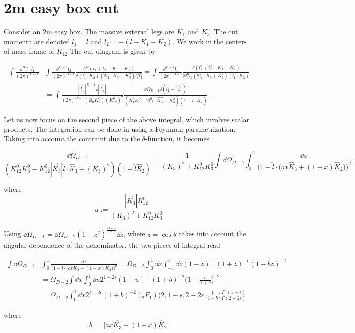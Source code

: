\section{2m easy box cut}
Consider an 2m easy box.
The massive external legs are $K_1$ and $K_3$.
The cut momenta are denoted $l_1 = l$ and $l_2 = -( l-K_1-K_2)$.
We work in the center-of-mass frame of $K_{12}$
The cut diagram is given by

\begin{equation*}
\begin{split}
\int\frac{\dd^{D-1}l_1}{(2\pi)^{D-1}} &
 \int\frac{\dd^{D-1}l_2}{(2\pi)^{D-1}}
\frac{\delta^{D}(l_1 + l_2 - K_1- K_2)}{8(l_1\cdot K_2)(2l_1\cdot K_3 + K_3^2)l_1^0 l_2^0} 
 = 
\int\frac{\dd^{D-1}l_1}{(2\pi)^{D-1}} 
\frac{\delta(l_1^0 + l_2^0 - K_1^0 - K_2^0)}{8 l_1^0 l_2^0 (2l_1\cdot K_3 + K_3^2)(l_1\cdot K_2)}
\\
& = \int\frac{|\vec{l}_1|^{D-2} \dd |\vec{l}_1|}{(2\pi)^{D-1}(2l_0 K_2^0)(K_{12}^0)^2}
\frac{\dd \Omega_{D-1} \delta(l_1^0 - \frac{K^0_{12}}{2})}{(2l_1^0 K_3^0 - 2l_1^0 \hat{l}\cdot\vec{K_3} + K_3^2)(1-\hat{l}\cdot \hat{K}_2)}
\end{split}
\end{equation*}

Let us now focus on the second piece of the above integral, which involves scalar products. 
The integration can be done in using a Feynman parametrization.
Taking into account the contraint due to the $\delta$-function, 
it becomes

\begin{equation*}
\frac{\dd \Omega_{D-1}}{(K_{12}^0 K_3^0 - K_{12}^0 |\vec{K}_3| \hat{l}\cdot \hat{K}_3 + (K_3)^2)(1-\hat{l}\hat{K}_2)}
= \frac{1}{(K_3)^2 + K_{12}^0 K_3^0}\int \dd \Omega_{D-1}\int_0^1\frac{\dd x}{\Big(1-\hat{l}\cdot\big(ax \hat{K}_3 + (1-x)\hat{K}_2\big)\Big)^2}
\end{equation*}

where 
\begin{equation*}
a := \frac{|\vec{K}_3|K_{12}^0}{(K_3)^2 + K_{12}^0 K_3^0}
\end{equation*}

Using $\dd\Omega_{D-1} = \dd \Omega_{D-2}(1-z^2)^{\frac{D-4}{2}}\dd z$, where $z = \cos\theta$ takes into account the angular dependence of the denominator, the two pieces of integral read

\begin{equation*}
\begin{split}
\int \dd \Omega_{D-1} &
\int_0^1\frac{\dd x}{\Big(1-\hat{l}\cdot\big(ax \hat{K}_3 + (1-x)\hat{K}_2\big)\Big)^2}
= \Omega_{D-2}\int_0^1\dd x \int_{-1}^1 \dd z (1-z)^{-\epsilon}(1+z)^{-\epsilon} (1-bz)^{-2}
\\
& = 
\Omega_{D-2}\int\dd x \int^1_0\dd u 2^{1-2\epsilon}(1-u)^{-\epsilon}(1+b)^{-2}\big(1-\frac{b}{1+b}\big)^{-2}
\\
& = 
\Omega_{D-2}\int^1_0 \dd x 2^{1-2\epsilon}(1+b)^{-2} (_2F_1)\big(2,1-\epsilon, 2-2\epsilon, \frac{b}{1+b}\big)
\frac{\Gamma^2(1-\epsilon)}{\Gamma(2-2\epsilon)} 
\end{split}
\end{equation*}

where 
\begin{equation*}
b := \big| ax \hat{K_3} + (1-x)\hat{K}_2\big|
\end{equation*}





